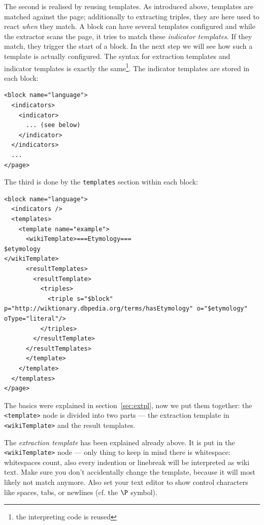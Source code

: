 The second is realised by reusing templates. 
As introduced above, templates are matched against the page; additionally to extracting triples, they are here used to react \textit{when} they match. 
A block can have several templates configured and while the extractor scans the page, it tries to match these \textit{indicator templates}.
If they match, they trigger the start of a block. In the next step we will see how such a template is actually configured. 
The syntax for extraction templates and indicator templates is exactly the same\footnote{the interpreting code is reused}. 
The indicator templates are stored in each block:
\begin{lstlisting}[style=XML]
<block name="language">
  <indicators>
    <indicator>
      ... (see below)
    </indicator>
  </indicators>
  ...
</page>
\end{lstlisting}

The third is done by the \texttt{templates} section within each block:
\begin{lstlisting}[style=XML]
<block name="language">
  <indicators />
  <templates>
    <template name="example">
      <wikiTemplate>===Etymology=== 
$etymology
</wikiTemplate>
      <resultTemplates>
        <resultTemplate>
          <triples>
            <triple s="$block" p="http://wiktionary.dbpedia.org/terms/hasEtymology" o="$etymology" oType="literal"/>
          </triples>
        </resultTemplate>
      </resultTemplates>
      </template>
    </template>
  </templates>
</page>
\end{lstlisting}
The basics were explained in section~\ref{sec:extpl}, now we put them together: the \texttt{<template>} node is divided into two parts --- the extraction template in \texttt{<wikiTemplate>} and the result templates.

The \textit{extraction template} has been explained already above. 
It is put in the \texttt{<wikiTemplate>} node --- only thing to keep in mind there is whitespace: whitespaces count, also every indention or linebreak will be interpreted as wiki text. 
Make sure you don't accidentally change the template, because it will most likely not match anymore.
Also set your text editor to show control characters like spaces, tabs, or newlines (cf. the $\P$ symbol).

